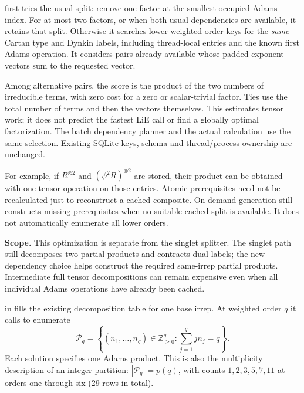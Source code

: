  first tries the
usual split: remove one factor at the smallest occupied Adams index. For at most
two factors, or when both usual dependencies are available, it retains that
split. Otherwise it searches lower-weighted-order keys for the \emph{same}
Cartan type and Dynkin labels, including thread-local entries and the known
first Adams operation. It considers pairs already available whose padded
exponent vectors sum to the requested vector.

Among alternative pairs, the score is the product of the two numbers of
irreducible terms, with zero cost for a zero or scalar-trivial factor. Ties use
the total number of terms and then the vectors themselves. This estimates
tensor work; it does not predict the fastest LiE call or find a globally optimal
factorization. The batch dependency planner and the actual calculation use the
same selection. Existing SQLite keys, schema and thread/process ownership are
unchanged.

For example, if $R^{\otimes2}$ and $(\psi^2R)^{\otimes2}$ are stored, their
product can be obtained with one tensor operation on those entries. Atomic
prerequisites need not be recalculated just to reconstruct a cached composite.
On-demand generation still constructs missing prerequisites when no suitable
cached split is available. It does not automatically enumerate all lower orders.

\textbf{Scope.} This optimization is separate from the singlet splitter. The
singlet path still decomposes two partial products and contracts dual labels;
the new dependency choice helps construct the required same-irrep partial
products. Intermediate full tensor decompositions can remain expensive even
when all individual Adams operations have already been cached.

\clearpage
{}
in  fills the existing decomposition
table for one base irrep. At weighted order $q$ it calls
 to enumerate
\[
 \mathcal P_q=\left\{(n_1,\ldots,n_q)\in\mathbb Z_{\geq0}^q:
                 \sum_{j=1}^{q}j n_j=q\right\}.
\]
Each solution specifies one Adams product. This is also the multiplicity
description of an integer partition: $|\mathcal P_q|=p(q)$, with counts
$1,2,3,5,7,11$ at orders one through six (29 rows in total).

